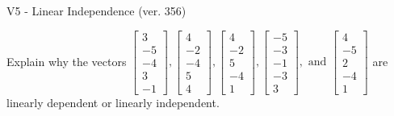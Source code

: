 \begin{exercise}
  \begin{exerciseTitle}V5 - Linear Independence (ver. 356)\end{exerciseTitle}
  \begin{exerciseStatement}
    Explain why the vectors \(\left[\begin{array}{r}
3 \\
-5 \\
-4 \\
3 \\
-1
\end{array}\right] , \left[\begin{array}{r}
4 \\
-2 \\
-4 \\
5 \\
4
\end{array}\right] , \left[\begin{array}{r}
4 \\
-2 \\
5 \\
-4 \\
1
\end{array}\right] , \left[\begin{array}{r}
-5 \\
-3 \\
-1 \\
-3 \\
3
\end{array}\right] , \text{ and } \left[\begin{array}{r}
4 \\
-5 \\
2 \\
-4 \\
1
\end{array}\right]\) are linearly dependent or linearly independent.	



\end{exerciseStatement}
\end{exercise}
